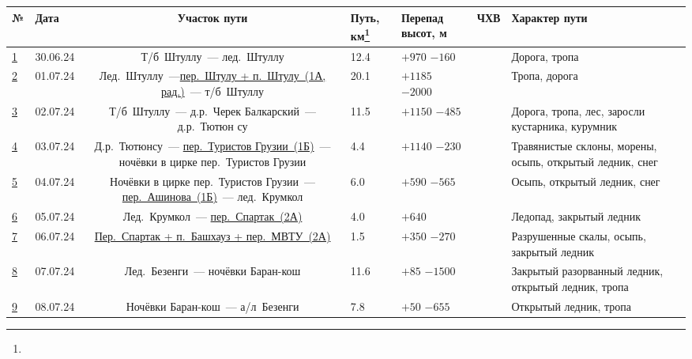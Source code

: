 		{\footnotesize
		\begin{longtable}{|A|B|C|B|B|D|E|} \hline
			№							&	Дата 		&	Участок пути																																																&	Путь, км\footnote{\textOne}	&	Перепад высот, м		&	ЧХВ		&	Характер пути																\\ \hline
			\hyperref[subsec:Day1]{1}	&	30.06.24	&	Т/б~Штуллу~--- лед.~Штуллу																																													&	12.4						&	$+970$ $-160$			&			&	Дорога, тропа																\\ \hline
			\hyperref[subsec:Day2]{2}	&	01.07.24	&	Лед.~Штуллу~---\hyperref[subsec:main_obstacles]{пер.~Штулу + п.~Штулу~(1А, рад.)}~--- т/б~Штуллу																											&	20.1						&	$+1185$ $-2000$			&			&	Тропа, дорога																\\ \hline
			\hyperref[subsec:Day3]{3}	&	02.07.24	&	Т/б~Штуллу~--- д.р.~Черек Балкарский~--- д.р.~Тютюн	су																																						&	11.5						&	$+1150$ $-485$			&			&	Дорога, тропа, лес, заросли кустарника, курумник							\\ \hline
			\hyperref[subsec:Day4]{4}	&	03.07.24	&	Д.р.~Тютюнсу~--- \hyperref[subsec:main_obstacles]{пер.~Туристов Грузии~(1Б)}~--- ночёвки в цирке пер.~Туристов Грузии																						&	4.4							&	$+1140$ $-230$ 			&			&	Травянистые склоны, морены, осыпь, открытый ледник, снег					\\ \hline
			\hyperref[subsec:Day5]{5}	&	04.07.24	&	Ночёвки в цирке пер.~Туристов Грузии~--- \hyperref[subsec:main_obstacles]{пер.~Ашинова~(1Б)}~--- лед.~Крумкол																								&	6.0							&	$+590$ $-565$ 			&			&	Осыпь, открытый ледник, снег												\\ \hline
			\hyperref[subsec:Day6]{6}	&	05.07.24	&	Лед.~Крумкол~--- \hyperref[subsec:main_obstacles]{пер.~Спартак~(2А)}																																		&	4.0							&	$+640$ 			 		&			&	Ледопад, закрытый ледник													\\ \hline
			\hyperref[subsec:Day7]{7}	&	06.07.24	&	\hyperref[subsec:main_obstacles]{Пер.~Спартак + п.~Башхауз + пер.~МВТУ~(2А)}																																&	1.5							&	$+350$ $-270$	 		&			&	Разрушенные скалы, осыпь, закрытый ледник									\\ \hline
			\hyperref[subsec:Day8]{8}	&	07.07.24	&	Лед.~Безенги~--- ночёвки Баран-кош																																											&	11.6						&	$+85$ $-1500$	 		&			&	Закрытый разорванный ледник, открытый ледник, тропа							\\ \hline
			\hyperref[subsec:Day9]{9}	&	08.07.24	&	Ночёвки Баран-кош~--- а/л~Безенги																																											&	7.8							&	$+50$ $-655$	 		&			&	Открытый ледник, тропа														\\ \hline

\end{longtable}}
